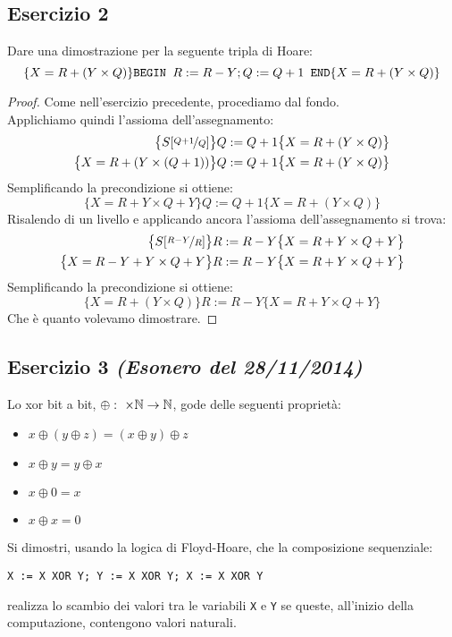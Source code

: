 \subsection{Esercizio 2}
Dare una dimostrazione per la seguente tripla di Hoare:
\[
  \{X=R+(Y \times Q) \} \text{\texttt{BEGIN }} R:=R-Y; Q:=Q+1
  \text{\texttt{ END}} \{X=R+(Y \times Q)\}
\]

\begin{proof}
Come nell'esercizio precedente, procediamo dal fondo.\\
Applichiamo quindi l'assioma dell'assegnamento:
\begin{align*}
  \bigl\{S[\nicefrac{Q+1}{Q}] \bigr\} & Q:=Q+1 \bigl\{X=R+(Y \times Q)\bigr\}\\
  \bigl\{X=R+(Y \times (Q+1)) \bigr\} & Q:=Q+1 \bigl\{X=R+(Y \times Q)\bigr\}
\end{align*}
Semplificando la precondizione si ottiene:
\[ \bigl\{X=R+Y \times Q + Y \bigr\} Q:=Q+1 \bigl\{X=R+(Y \times Q)\bigr\} \]
Risalendo di un livello e applicando ancora l'assioma dell'assegnamento si trova:
\begin{align*}
\bigl\{S[\nicefrac{R-Y}{R}] \bigr\} & R:=R-Y \bigl\{X=R+Y \times Q + Y \bigr\}\\
\bigl\{X= R-Y+Y \times Q+Y \bigr\} & R:=R-Y \bigl\{X=R+Y \times Q + Y \bigr\}
\end{align*}
Semplificando la precondizione si ottiene:
\[ \bigl\{X= R+(Y \times Q) \bigr\} R:=R-Y \bigl\{X=R+Y \times Q + Y \bigr\} \]
Che è quanto volevamo dimostrare.
\end{proof}

\subsection{Esercizio 3 \emph{(Esonero del 28/11/2014)}}
Lo xor bit a bit, $ \oplus: \ \times \mathbb{N} \rightarrow \mathbb{N} $, gode delle
seguenti proprietà:
\begin{itemize}
        \item $ x \oplus (y \oplus z) = (x \oplus y) \oplus z $ 
        \item $ x \oplus y = y \oplus x $ 
        \item $ x \oplus 0 = x $ 
        \item $ x \oplus x = 0 $ 
\end{itemize}
Si dimostri, usando la logica di Floyd-Hoare, che la composizione sequenziale:
\begin{center}
\texttt{X := X XOR Y; Y := X XOR Y; X := X XOR Y}
\end{center}
realizza lo scambio dei valori tra le variabili \texttt{X} e \texttt{Y} se queste, all'inizio della computazione, contengono valori naturali.

